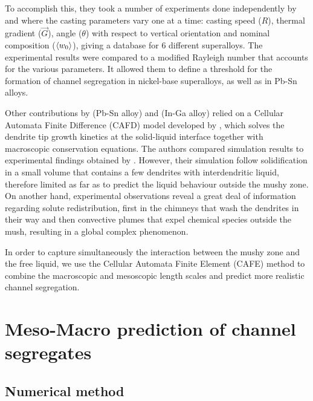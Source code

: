To accomplish this, they took a number of experiments done independently by \citet{pollock_breakdown_1996} and \citet{auburtin_freckle_2000} 
where the casting parameters vary one at a time: casting speed ($R$), thermal gradient ($\vec{G}$), angle ($\theta$) with respect to vertical 
orientation and nominal composition ($\left \langle w_0 \right \rangle$), giving a database for 6 different superalloys. The experimental results were 
compared to a modified Rayleigh number that accounts for the various parameters. It allowed them to define a threshold for the formation
of channel segregation in nickel-base superalloys, as well as in Pb-Sn alloys.

Other contributions by \citet{yuan_new_2012} (Pb-Sn alloy) and  \citet{karagadde_3-d_2014} (In-Ga alloy) relied on a Cellular Automata Finite Difference
(CAFD) model developed by \citet{lee_modeling_2002}, which  solves the dendrite tip growth kinetics at 
the solid-liquid interface together with macroscopic conservation equations. 
The authors compared simulation results to experimental findings obtained by \citet{shevchenko_chimney_2013}.
However, their simulation follow solidification in a small volume that contains a few dendrites with interdendritic liquid, 
therefore limited as far as to predict the liquid behaviour outside the mushy zone.
On another hand, experimental observations reveal a great deal of information 
regarding solute redistribution, first in the chimneys that wash the dendrites in their 
way and then convective plumes that expel chemical species outside the mush, resulting in a global complex phenomenon.

In order to capture simultaneously the interaction between the mushy zone and the free liquid, we use 
the Cellular Automata Finite Element (CAFE) method to combine the macroscopic and mesoscopic length scales
and predict more realistic channel segregation.

\section{Meso-Macro prediction of channel segregates}

\subsection{Numerical method}

